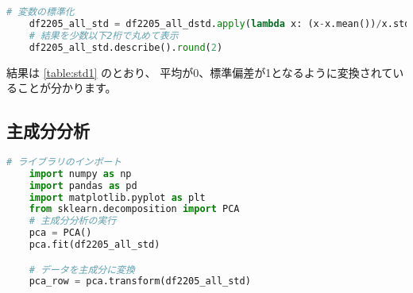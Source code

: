 \documentclass[submit,noauthor]{ono}
\begin{document}
\begin{lstlisting}[language=Python,breaklines]
	# 変数の標準化
	df2205_all_std = df2205_all_dstd.apply(lambda x: (x-x.mean())/x.std(), axis=0)
	# 結果を少数以下2桁で丸めて表示
	df2205_all_std.describe().round(2)
\end{lstlisting}

結果は \ref{table:std1} のとおり、
平均が0、標準偏差が1となるように変換されていることが分かります。

\subsection{主成分分析}

\begin{lstlisting}[language=Python,breaklines]
	# ライブラリのインポート
	import numpy as np
	import pandas as pd
	import matplotlib.pyplot as plt
	from sklearn.decomposition import PCA
	# 主成分分析の実行
	pca = PCA()
	pca.fit(df2205_all_std)

	# データを主成分に変換
	pca_row = pca.transform(df2205_all_std)
\end{lstlisting}

\onecolumn

\begin{figure}[tb]
	\label{fig:box100000000000000000000000000000}
\end{figure}
\end{document}
